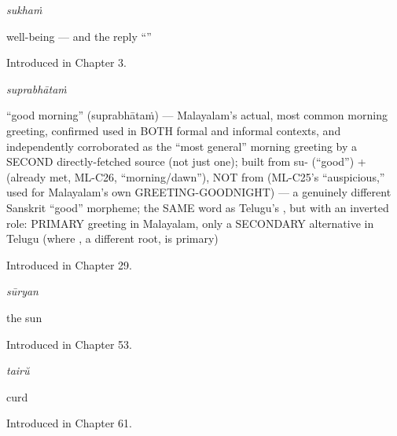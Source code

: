 \noindent\begin{minipage}[t]{\linewidth}
\raggedright
\textbf{}\enspace\emph{sukhaṁ}\par
\small well-being — and the reply \textquotedblleft{}\textquotedblright{}\par
\footnotesize Introduced in Chapter 3.
\end{minipage}\par\medskip

\noindent\begin{minipage}[t]{\linewidth}
\raggedright
\textbf{}\enspace\emph{suprabhātaṁ}\par
\small \textquotedblleft{}good morning\textquotedblright{} (suprabhātaṁ) — Malayalam's actual, most common morning greeting, confirmed used in BOTH formal and informal contexts, and independently corroborated as the \textquotedblleft{}most general\textquotedblright{} morning greeting by a SECOND directly-fetched source (not just one); built from su- (\textquotedblleft{}good\textquotedblright{}) +  (already met, ML-C26, \textquotedblleft{}morning/dawn\textquotedblright{}), NOT from  (ML-C25's \textquotedblleft{}auspicious,\textquotedblright{} used for Malayalam's own GREETING-GOODNIGHT) — a genuinely different Sanskrit \textquotedblleft{}good\textquotedblright{} morpheme; the SAME word as Telugu's , but with an inverted role: PRIMARY greeting in Malayalam, only a SECONDARY alternative in Telugu (where , a different root, is primary)\par
\footnotesize Introduced in Chapter 29.
\end{minipage}\par\medskip

\noindent\begin{minipage}[t]{\linewidth}
\raggedright
\textbf{}\enspace\emph{sūryan}\par
\small the sun\par
\footnotesize Introduced in Chapter 53.
\end{minipage}\par\medskip

\noindent\begin{minipage}[t]{\linewidth}
\raggedright
\textbf{}\enspace\emph{tairŭ}\par
\small curd\par
\footnotesize Introduced in Chapter 61.
\end{minipage}\par\medskip

